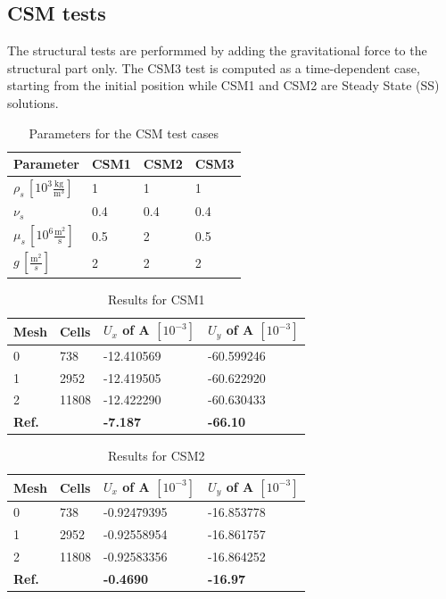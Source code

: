 \subsection{CSM tests}
The structural tests are performmed by adding the gravitational force to the structural part only. The CSM3 test is computed as a time-dependent case, starting from the initial position while CSM1 and CSM2 are Steady State (SS) solutions. 
\begin{table}[!ht]
\begin{center}
  \begin{tabular}{|l | l | l | l|} \hline
	Parameter & CSM1 & CSM2 & CSM3 \\ \hline
    $\rho_s\, [10^3\frac{\text{kg}}{\text{m}^3}]$  & 1 & 1 & 1 \\   \hline
    $\nu_s $ & 0.4 & 0.4 & 0.4 \\ \hline
    $\mu_s \,[10^{6}\frac{\text{m}^2}{\text{s}}]$ & 0.5 & 2 & 0.5   \\ \hline
    $g \, [\frac{\text{m}^2}{s}]$ & 2 & 2 & 2 \\ \hline
    \hline
  \end{tabular}
\end{center}
\caption{Parameters for the CSM test cases}
\end{table}

\begin{table}[!h]
\begin{center}
  \begin{tabular}{|l | l | l | l|} \hline
	Mesh & Cells & $U_x$ of A $[10^{-3}]$ & $U_y$ of A $[10^{-3}]$\\ \hline
    0  & 738 & -12.410569 & -60.599246 \\   \hline
    1 & 2952 & -12.419505 & -60.622920 \\ \hline
    2 & 11808 & -12.422290 & -60.630433   \\ \hline \hline
    \textbf{Ref.}  & & \textbf{-7.187} & \textbf{-66.10} \\ \hline 
    \hline
  \end{tabular}
\end{center}
\caption{Results for CSM1}
\end{table}

\begin{table}[!h]
\begin{center}
  \begin{tabular}{|l | l | l | l|} \hline
	Mesh & Cells & $U_x$ of A $[10^{-3}]$ & $U_y$ of A $[10^{-3}]$\\ \hline
    0  & 738 & -0.92479395 & -16.853778 \\   \hline
    1 & 2952 & -0.92558954 & -16.861757 \\ \hline
    2 & 11808 & -0.92583356 & -16.864252   \\ \hline \hline
    \textbf{Ref.}  & & \textbf{-0.4690} & \textbf{-16.97} \\ \hline 
    \hline
  \end{tabular}
\end{center}
\caption{Results for CSM2}
\end{table}




